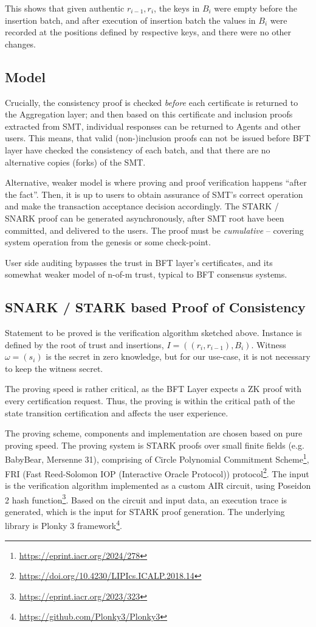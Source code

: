 This shows that given authentic $r_{i-1}, r_i$, the keys in $B_i$ were empty before the insertion batch, and after execution of insertion batch the values in $B_i$ were recorded at the positions defined by respective keys, and there were no other changes.


\subsection{Model}

Crucially, the consistency proof is checked \emph{before} each certificate is returned to the Aggregation layer; and then based on this certificate and inclusion proofs extracted from SMT, individual responses can be returned to Agents and other users. This means, that valid (non-)inclusion proofs can not be issued before BFT layer have checked the consistency of each batch, and that there are no alternative copies (forks) of the SMT.

Alternative, weaker model is where proving and proof verification happens ``after the fact''. Then, it is up to users to obtain assurance of SMT's correct operation and make the transaction acceptance decision accordingly. The STARK / SNARK proof can be generated asynchronously, after SMT root have been committed, and delivered to the users. The proof must be \emph{cumulative} -- covering system operation from the genesis or some check-point.

User side auditing bypasses the trust in BFT layer's certificates, and its somewhat weaker model of n-of-m trust, typical to BFT consensus systems.


\subsection{SNARK / STARK based Proof of Consistency}

Statement to be proved is the verification algorithm sketched above. Instance is defined by the root of trust and insertions, $I = ((r_i, r_{i-1}),B_i)$. Witness $\omega = (s_i)$ is the secret in zero knowledge, but for our use-case, it is not necessary to keep the witness secret.

The proving speed is rather critical, as the BFT Layer expects a ZK proof with every certification request. Thus, the proving is within the critical path of the state transition certification and affects the user experience.

The proving scheme, components and implementation are chosen based on pure proving speed. The proving system is STARK proofs over small finite fields (e.g. BabyBear, Mersenne 31), comprising of Circle Polynomial Commitment Scheme\footnote{\url{https://eprint.iacr.org/2024/278}},  FRI (Fast Reed-Solomon IOP (Interactive Oracle Protocol)) protocol\footnote{\url{https://doi.org/10.4230/LIPIcs.ICALP.2018.14}}. The input is the verification algorithm implemented as a custom AIR circuit, using Poseidon 2 hash function\footnote{\url{https://eprint.iacr.org/2023/323}}. Based on the circuit and input data, an execution trace is generated, which is the input for STARK proof generation. The underlying library is Plonky 3 framework\footnote{\url{https://github.com/Plonky3/Plonky3}}.


